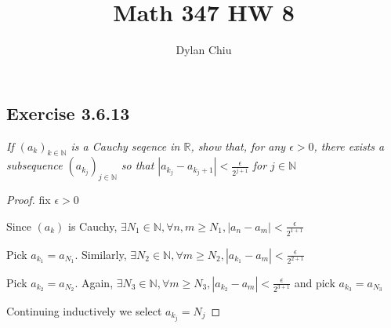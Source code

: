\documentclass[12pt, a4paper]{article}
\title{Math 347 HW 8}
\author{Dylan Chiu}
\begin{document}
    \maketitle
    \subsection*{Exercise 3.6.13}
        \textit{If $(a_k)_{k\in\mathbb{N}}$ is a Cauchy seqence in $\mathbb{R}$, show that, for any $\epsilon > 0$,
        there exists a subsequence $(a_{k_j})_{j\in\mathbb{N}}$ so that $|a_{k_j} - a_{k_j+1} | < \frac{\epsilon}{2^{j+1}}$
        for $j\in\mathbb{N}$}
        \begin{proof}
            fix $\epsilon > 0$

            Since $(a_k)$ is Cauchy, $\exists N_1\in \mathbb{N}, \forall n,m \ge N_1, |a_n-a_m| < \frac{\epsilon}{2^{1+1}}$

            Pick $a_{k_1} = a_{N_1}$. Similarly, $\exists N_2\in \mathbb{N}, \forall m \ge N_2, |a_{k_1}-a_m| < \frac{\epsilon}{2^{2+1}}$

            Pick $a_{k_2} = a_{N_2}$. Again, $\exists N_3\in \mathbb{N}, \forall m \ge N_3, |a_{k_2}-a_m| < \frac{\epsilon}{2^{3+1}}$ and pick $a_{k_3} = a_{N_3}$
            
            Continuing inductively we select $a_{k_j} = N_j$

        \end{proof}
\end{document}
